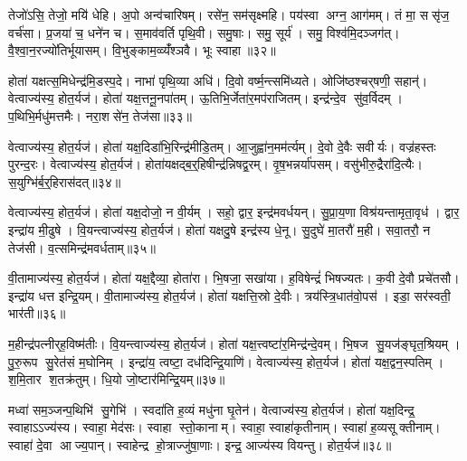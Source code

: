 तेजो॑ऽसि॒ तेजो॒ मयि॑ धेहि। अ॒पो अन्व॑चारिषम्। रसे॑न॒ सम॑सृक्ष्महि। पय॑स्वा अग्न॒ आग॑मम्। तं मा॒ ससृ॑ज॒ वर्च॑सा। प्र॒जया॑ च॒ धने॑न च। स॒माव॑वर्ति पृथि॒वी। समु॒षाः। समु॒ सूर्य॑। समु॒ विश्व॑मि॒दञ्जग॑त्। वै॒श्वा॒न॒रज्यो॑तिर्भूयासम्। वि॒भुङ्काम॒व्व्यँ॑श्ञवै। भूः स्वाहा॥३२॥\anuvakamend[स्वप्न॒ एनासि चकृ॒मा व॒यं मु॑ञ्च॒ मला॑दिव स॒मिद॑सि॒ जग॒त्रीणि॑ च]

होता॑ यक्षत्स॒मिधेन्द्र॑मि॒डस्प॒दे। नाभा॑ पृथि॒व्या अधि॑। दि॒वो वर्ष्म॒न्त्समि॑ध्यते। ओजि॑ष्ठश्चर्‌षणी॒ सहान्॑। वेत्वाज्य॑स्य॒ होत॒र्यज॑। होता॑ यक्ष॒त्तनू॒नपा॑तम्। ऊ॒तिभि॒र्जेता॑र॒मप॑राजितम्। इन्द्र॑न्दे॒व सु॑व॒र्विदम्। प॒थिभि॒र्मधु॑मत्तमैः। नरा॒शसे॑न॒ तेज॑सा॥३३॥

वेत्वाज्य॑स्य॒ होत॒र्यज॑। होता॑ यक्ष॒दिडा॑भि॒रिन्द्र॑मीडि॒तम्। आ॒जुह्वा॑न॒मम॑र्त्यम्। दे॒वो दे॒वैः सवीर्यः। वज्र॑हस्तः पुरन्द॒रः। वेत्वाज्य॑स्य॒ होत॒र्यज॑। होता॑यक्षद्ब॒र्॒हिषीन्द्र॑न्निषद्व॒रम्। वृ॒ष॒भन्नर्या॑पसम्। वसु॑भीरु॒द्रैरा॑दि॒त्यैः। स॒युग्भि॑र्ब॒र्॒हिरास॑दत्॥३४॥

वेत्वाज्य॑स्य॒ होत॒र्यज॑। होता॑ यक्ष॒दोजो॒ न वी॒र्यम्। सहो॒ द्वार॒ इन्द्र॑मवर्धयन्। सु॒प्रा॒य॒णा विश्र॑यन्तामृता॒वृध॑। द्वार॒ इन्द्रा॑य मी॒ढुषे। वि॒यन्त्वाज्य॑स्य॒ होत॒र्यज॑। होता॑ यक्षदु॒षे इन्द्र॑स्य धे॒नू। सु॒दुघे॑ मा॒तरौ॑ म॒ही। सवा॒तरौ॒ न तेज॑सी। व॒त्समिन्द्र॑मवर्धताम्॥३५॥

वी॒तामाज्य॑स्य॒ होत॒र्यज॑। होता॑ यक्ष॒द्दैव्या॒ होता॑रा। भि॒षजा॒ सखा॑या। ह॒विषेन्द्रं॑ भिषज्यतः। क॒वी दे॒वौ प्रचे॑तसौ। इन्द्रा॑य धत्त इन्द्रि॒यम्। वी॒तामाज्य॑स्य॒ होत॒र्यज॑। होता॑ यक्षत्ति॒स्रो दे॒वीः। त्रय॑स्त्रि॒धात॑वो॒पस॑। इडा॒ सर॑स्वती॒ भार॑ती॥३६॥

म॒हीन्द्र॑पत्नीर्‌ह॒विष्म॑तीः। वि॒यन्त्वाज्य॑स्य॒ होत॒र्यज॑। होता॑ यक्ष॒त्त्वष्टा॑र॒मिन्द्र॑न्दे॒वम्। भि॒षज सु॒यज॑ङ्घृत॒श्रियम्। पु॒रु॒रूप सु॒रेत॑सं म॒घोनिम्। इन्द्रा॑य॒ त्वष्टा॒ दध॑दिन्द्रि॒याणि॑। वेत्वाज्य॑स्य॒ होत॒र्यज॑। होता॑ यक्ष॒द्वन॒स्पतिम्। श॒मि॒तार श॒तक्र॑तुम्। धि॒यो जो॒ष्टार॑मिन्द्रि॒यम्॥३७॥

मध्वा॑ सम॒ञ्जन्प॒थिभि॑ सु॒गेभि॑। स्वदा॑ति ह॒व्यं मधु॑ना घृ॒तेन॑। वेत्वाज्य॑स्य॒ होत॒र्यज॑। होता॑ यक्ष॒दिन्द्र॒ स्वाहाऽऽज्य॑स्य। स्वाहा॒ मेद॑सः। स्वाहा स्तो॒कानाम्। स्वाहा॒ स्वाहा॑कृतीनाम्। स्वाहा॑ ह॒व्यसूक्तीनाम्। स्वाहा॑ दे॒वा आज्य॒पान्। स्वाहेन्द्र हो॒त्राज्जु॑षा॒णाः। इन्द्र॒ आज्य॑स्य वियन्तु। होत॒र्यज॑॥३८॥\anuvakamend[तेज॑साऽऽसददवर्धतां॒ भार॑तीन्द्रि॒यञ्जु॑षा॒णा द्वे च॑ (स॒मिधेन्द्र॒न्तनू॒नपा॑त॒मिडा॑भिर्ब॒र्॒हिष्योज॑ उ॒षे दैव्या॑ ति॒स्रस्त्वष्टा॑रं॒ वन॒स्पति॒मिन्द्रम् ॥ स॒मिधेन्द्रं॑ च॒तुर्वेत्वेको॑ वि॒यन्तु॒ द्विर्वी॒तामेको॑ वि॒यन्तु॒ द्विर्वेत्वेको॑ वि॒यन्तु॒ होत॒र्यज॑ ॥ )]

